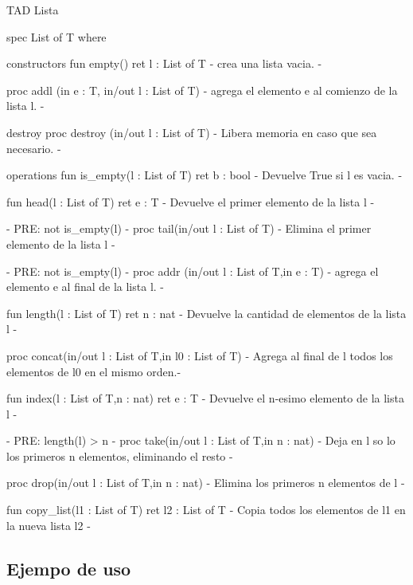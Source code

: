 \begin{codebox}{TAD Lista}
\begin{pascallike}
spec List of T where

constructors    
    fun empty() ret l : List of T
    {- crea una lista vacia. -}

    proc addl (in e : T, in/out l : List of T)
    {- agrega el elemento e al comienzo de la lista l. -}

destroy
    proc destroy (in/out l : List of T)
    {- Libera memoria en caso que sea necesario. -}

operations
    fun is_empty(l : List of T) ret b : bool
    {- Devuelve True si l es vacia. -}

    fun head(l : List of T) ret e : T
    {- Devuelve el primer elemento de la lista l -}

    {- PRE: not is_empty(l) -}
    proc tail(in/out l : List of T)
    {- Elimina el primer elemento de la lista l -}

    {- PRE: not is_empty(l) -}
    proc addr (in/out l : List of T,in e : T)
    {- agrega el elemento e al final de la lista l. -}

    fun length(l : List of T) ret n : nat
    {- Devuelve la cantidad de elementos de la lista l -}

    proc concat(in/out l : List of T,in l0 : List of T)
    {- Agrega al final de l todos los elementos de l0
    en el mismo orden.-}

    fun index(l : List of T,n : nat) ret e : T
    {- Devuelve el n-esimo elemento de la lista l -}

    {- PRE: length(l) > n -}
    proc take(in/out l : List of T,in n : nat)
    {- Deja en l so lo los primeros n
    elementos, eliminando el resto -}

    proc drop(in/out l : List of T,in n : nat)
    {- Elimina los primeros n elementos de l -}

    fun copy_list(l1 : List of T) ret l2 : List of T
    {- Copia todos los elementos de l1 en la nueva lista l2 -}
\end{pascallike}
\end{codebox}

\subsection{Ejempo de uso}

